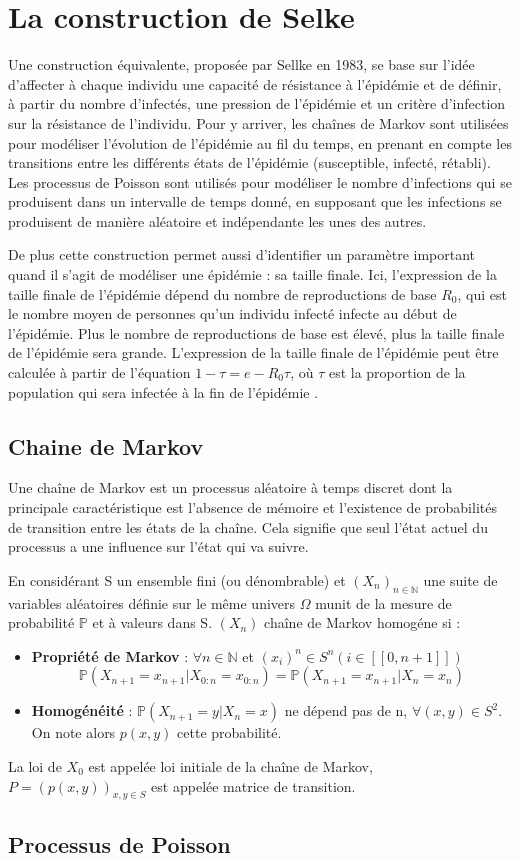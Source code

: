 \section{La construction de Selke}

Une construction équivalente, proposée par Sellke en 1983, se base sur l’idée d’affecter à chaque individu une capacité de résistance à l’épidémie et de définir, à partir du nombre d’infectés, une pression de l’épidémie et un critère d’infection sur la résistance de l’individu. Pour y arriver, les chaînes de Markov sont utilisées pour modéliser l’évolution de l’épidémie au fil du temps, en prenant en compte les transitions entre les différents états de l’épidémie (susceptible, infecté, rétabli). Les processus de Poisson sont utilisés pour modéliser le nombre d’infections qui se produisent dans un intervalle de temps donné, en supposant que les infections se produisent de manière aléatoire et indépendante les unes des autres.

De plus cette construction permet aussi d’identifier un paramètre important quand il s’agit de modéliser une épidémie : sa taille finale. Ici, l’expression de la taille finale de l’épidémie dépend du nombre de reproductions de base $R_0$, qui est le nombre moyen de personnes qu’un individu infecté infecte au début de l’épidémie. Plus le nombre de reproductions de base est élevé, plus la taille finale de l’épidémie sera grande. L’expression de la taille finale de l’épidémie peut être calculée à partir de l’équation $1 - \tau = e - R_0\tau$, où $\tau$ est la proportion de la population qui sera infectée à la fin de l’épidémie .


\subsection{Chaine de Markov}

Une chaîne de Markov est un processus aléatoire à temps discret dont la principale caractéristique est l’absence de mémoire et l’existence de probabilités de transition entre les états de la chaîne. Cela signifie que seul l’état actuel du processus a une influence sur l’état qui va suivre.

En considérant S un ensemble fini (ou dénombrable) et $(X_n)_{n \in \mathbb{N}}$ une suite de variables aléatoires définie sur le même univers $\Omega$ munit de la mesure de probabilité $\mathbb{P}$ et à valeurs dans S. $(X_n)$ chaîne de Markov homogéne si :

\begin{itemize}
    \item \textbf{Propriété de Markov} : $\forall n \in \mathbb{N}$ et $(x_i)^n \in S^n (i \in [[0, n+1]])$ \\
    $$ \mathbb{P}(X_{n+1} = x_{n+1} | X_{0:n} = x_{0:n}) = \mathbb{P}(X_{n+1} = x_{n+1} | X_n = x_n) $$
    \item \textbf{Homogénéité} : $\mathbb{P}(X_{n+1} = y | X_n = x)$ ne dépend pas de n, $\forall (x, y) \in S^2$. On note alors $p(x, y)$ cette probabilité.
\end{itemize}

La loi de $X_0$ est appelée loi initiale de la chaîne de Markov, $P = (p(x, y))_{x,y \in S}$ est appelée matrice de transition.

\subsection{Processus de Poisson}


